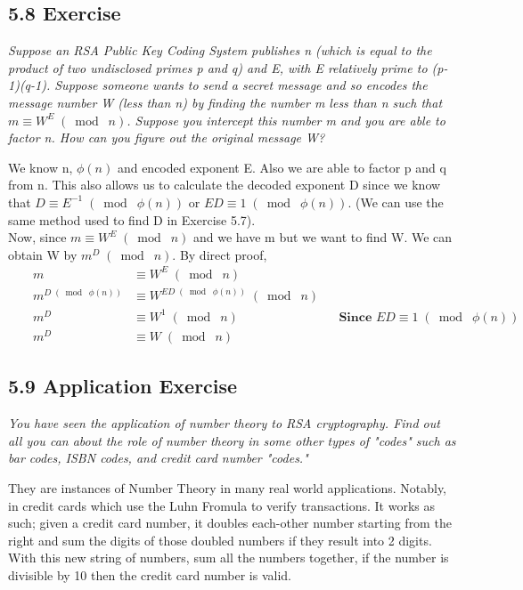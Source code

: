 \documentclass{article}
\begin{document}
\subsection*{5.8 Exercise} 
\quad \textit{Suppose an RSA Public Key Coding System publishes n (which is equal to the product of two undisclosed primes p and q) and E, with E relatively prime to (p-1)(q-1). Suppose someone wants to send a secret message and so encodes the message number W (less than n) by finding the number m less than n such that $m \equiv W^E \;(\bmod\; n)$. Suppose you intercept this number m and you are able to factor n. How can you figure out the original message W?}

We know n, $\phi(n)$ and encoded exponent E. Also we are able to factor p and q from n. This also allows us to calculate the decoded exponent D since we know that $D \equiv E^{-1} \;(\bmod\; \phi(n))$ or $ED \equiv 1 \;(\bmod\; \phi(n))$. (We can use the same method used to find D in Exercise 5.7).\\
Now, since $m \equiv W^E \;(\bmod\; n)$ and we have m but we want to find W. We can obtain W by $m^D \;(\bmod\; n)$. By direct proof,
\begin{align*}
    &&m &\equiv W^E \;(\bmod\; n) &&\\
    &&m^{D \;(\bmod\; \phi(n))}  &\equiv W^{ED \;(\bmod\; \phi(n))} \;(\bmod\; n) &&\\
    &&m^D &\equiv W^1 \;(\bmod\; n) && \textbf{Since $ED \equiv 1 \;(\bmod\; \phi(n))$}\\
    &&m^D &\equiv W \;(\bmod\; n) &&
\end{align*}

\subsection*{5.9 Application Exercise} 
\quad \textit{You have seen the application of number theory to RSA cryptography. Find out all you can about the role of number theory in some other types of "codes" such as bar codes, ISBN codes, and credit card number "codes."}

They are instances of Number Theory in many real world applications. Notably, in credit cards which use the Luhn Fromula to verify transactions. It works as such; given a credit card number, it doubles each-other number starting from the right and sum the digits of those doubled numbers if they result into 2 digits. With this new string of numbers, sum all the numbers together, if the number is divisible by 10 then the credit card number is valid.
\end{document}
